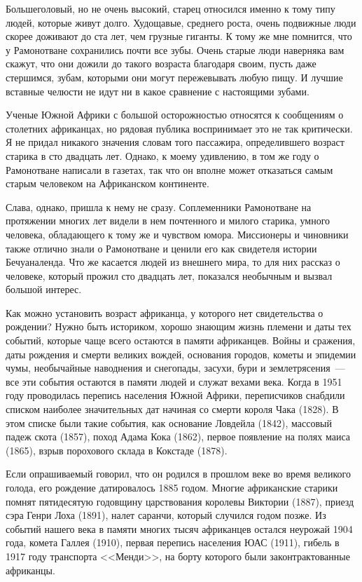 \documentclass[12pt,a4paper,twoside,openany,svgnames]{memoir}
\begin{document}
Большеголовый, но не очень высокий, старец относился именно к тому типу людей, которые живут долго. Худощавые, среднего роста, очень подвижные люди скорее доживают до ста лет, чем грузные гиганты. К тому же мне помнится, что у Рамонотване сохранились почти все зубы. Очень старые люди наверняка вам скажут, что они дожили до такого возраста благодаря своим, пусть даже стершимся, зубам, которыми они могут пережевывать любую пищу. И лучшие вставные челюсти не идут ни в какое сравнение с настоящими зубами.

Ученые Южной Африки с большой осторожностью относятся к сообщениям о столетних африканцах, но рядовая публика воспринимает это не так критически. Я не придал никакого значения словам того пассажира, определившего возраст старика в сто двадцать лет. Однако, к моему удивлению, в том же году о Рамонотване написали в газетах, так что он вполне может отказаться самым старым человеком на Африканском континенте.

Слава, однако, пришла к нему не сразу. Соплеменники Рамонотване на протяжении многих лет видели в нем почтенного и милого старика, умного человека, обладающего к тому же и чувством юмора. Миссионеры и чиновники также отлично знали о Рамонотване и ценили его как свидетеля истории Бечуаналенда. Что же касается людей из внешнего мира, то для них рассказ о человеке, который прожил сто двадцать лет, показался необычным и вызвал большой интерес.

Как можно установить возраст африканца, у которого нет свидетельства о рождении? Нужно быть историком, хорошо знающим жизнь племени и даты тех событий, которые чаще всего остаются в памяти африканцев. Войны и сражения, даты рождения и смерти великих вождей, основания городов, кометы и эпидемии чумы, необычайные наводнения и снегопады, засухи, бури и землетрясения~--- все эти события остаются в памяти людей и служат вехами века. Когда в 1951 году проводилась перепись населения Южной Африки, переписчиков снабдили списком наиболее значительных дат начиная со смерти короля Чака (1828). В этом списке были такие события, как основание Ловдейла (1842), массовый падеж скота (1857), поход Адама Кока (1862), первое появление на полях маиса (1865), взрыв порохового склада в Кокстаде (1878).

Если опрашиваемый говорил, что он родился в прошлом веке во время великого голода, его рождение датировалось 1885 годом. Многие африканские старики помнят пятидесятую годовщину царствования королевы Виктории (1887), приезд сэра Генри Лоха (1891), налет саранчи, который случился годом позже. Из событий нашего века в памяти многих тысяч африканцев остался неурожай 1904 года, комета Галлея (1910), первая перепись населения ЮАС (1911), гибель в 1917 году транспорта <<Менди>>, на борту которого были законтрактованные африканцы.
\end{document}
